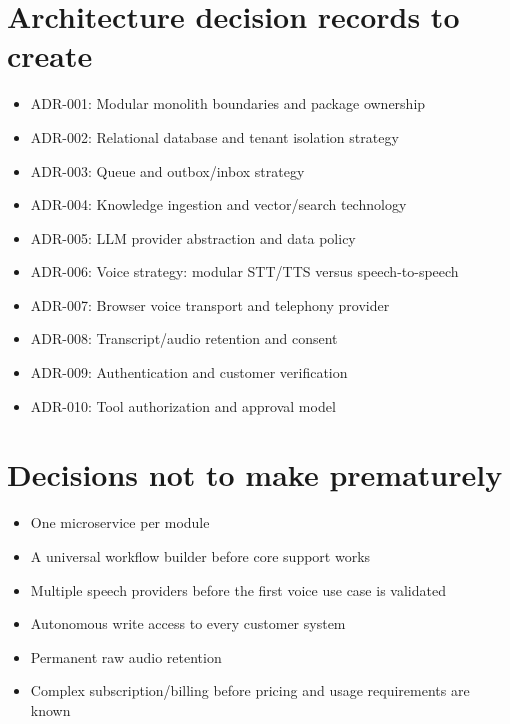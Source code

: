 \section{Architecture decision records to create}

\begin{itemize}
\item ADR-001: Modular monolith boundaries and package ownership
\item ADR-002: Relational database and tenant isolation strategy
\item ADR-003: Queue and outbox/inbox strategy
\item ADR-004: Knowledge ingestion and vector/search technology
\item ADR-005: LLM provider abstraction and data policy
\item ADR-006: Voice strategy: modular STT/TTS versus speech-to-speech
\item ADR-007: Browser voice transport and telephony provider
\item ADR-008: Transcript/audio retention and consent
\item ADR-009: Authentication and customer verification
\item ADR-010: Tool authorization and approval model
\end{itemize}


\section{Decisions not to make prematurely}

\begin{itemize}
\item One microservice per module
\item A universal workflow builder before core support works
\item Multiple speech providers before the first voice use case is validated
\item Autonomous write access to every customer system
\item Permanent raw audio retention
\item Complex subscription/billing before pricing and usage requirements are known
\end{itemize}






